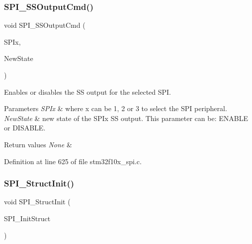 \subsubsection{\texorpdfstring{S\+P\+I\+\_\+\+S\+S\+Output\+Cmd()}{SPI\_SSOutputCmd()}}
{\footnotesize\ttfamily void S\+P\+I\+\_\+\+S\+S\+Output\+Cmd (\begin{DoxyParamCaption}\item[{\hyperlink{struct_s_p_i___type_def}{S\+P\+I\+\_\+\+Type\+Def} $\ast$}]{S\+P\+Ix,  }\item[{\hyperlink{group___exported__types_gac9a7e9a35d2513ec15c3b537aaa4fba1}{Functional\+State}}]{New\+State }\end{DoxyParamCaption})}



Enables or disables the SS output for the selected S\+PI. 


\begin{DoxyParams}{Parameters}
{\em S\+P\+Ix} & where x can be 1, 2 or 3 to select the S\+PI peripheral. \\
\hline
{\em New\+State} & new state of the S\+P\+Ix SS output. This parameter can be\+: E\+N\+A\+B\+LE or D\+I\+S\+A\+B\+LE. \\
\hline
\end{DoxyParams}

\begin{DoxyRetVals}{Return values}
{\em None} & \\
\hline
\end{DoxyRetVals}


Definition at line 625 of file stm32f10x\+\_\+spi.\+c.

\mbox{\label{group___s_p_i___private___functions_ga9a0116f88cc2c4478c270f05608703f1}} 
\subsubsection{\texorpdfstring{S\+P\+I\+\_\+\+Struct\+Init()}{SPI\_StructInit()}}
{\footnotesize\ttfamily void S\+P\+I\+\_\+\+Struct\+Init (\begin{DoxyParamCaption}\item[{\hyperlink{struct_s_p_i___init_type_def}{S\+P\+I\+\_\+\+Init\+Type\+Def} $\ast$}]{S\+P\+I\+\_\+\+Init\+Struct }\end{DoxyParamCaption})}



